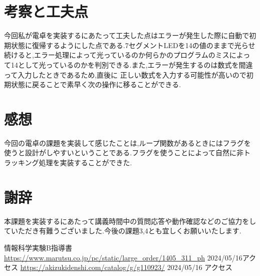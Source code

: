 \documentclass[dvipdfmx]{jarticle}
\begin{document}
\section{考察と工夫点}
今回私が電卓を実装するにあたって工夫した点はエラーが発生した際に自動で初期状態に復帰するようにした点である.7セグメントLEDを14の値のままで光らせ続けると,エラー処理によって光っているのか何らかのプログラムのミスによって14として光っているのかを判別できる.また,エラーが発生するのは数式を間違って入力したときであるため,直後に
正しい数式を入力する可能性が高いので初期状態に戻ることで素早く次の操作に移ることができる.
\section{感想}
今回の電卓の課題を実装して感じたことは,ループ関数があるときにはフラグを使うと設計がしやすいということである.フラグを使うことによって自然に非トラッキング処理を実装することができた.
\section{謝辞}
本課題を実装するにあたって講義時間中の質問応答や動作確認などのご協力をしていただき有難うございました.今後の課題3,4とも宜しくお願いいたします.
\begin{thebibliography}{10}
     情報科学実験B指導書
     \url{https://www.marutsu.co.jp/pc/static/large_order/1405_311_ph} 2024/05/16アクセス
     \url{https://akizukidenshi.com/catalog/g/g110923/} 2024/05/16 アクセス
\end{thebibliography}
\end{document}
